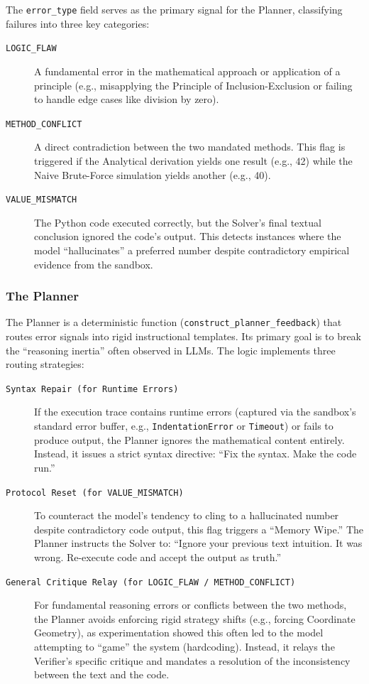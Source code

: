 \documentclass{article}
\begin{document}
The \texttt{error\_type} field serves as the primary signal for the Planner, classifying failures into three key categories:

\begin{description}
  \item[\texttt{LOGIC\_FLAW}]
  A fundamental error in the mathematical approach or application of a principle (e.g., misapplying the Principle of Inclusion-Exclusion or failing to handle edge cases like division by zero).
  
  \item[\texttt{METHOD\_CONFLICT}]
  A direct contradiction between the two mandated methods. This flag is triggered if the Analytical derivation yields one result (e.g., 42) while the Naive Brute-Force simulation yields another (e.g., 40).
  
  \item[\texttt{VALUE\_MISMATCH}]
  The Python code executed correctly, but the Solver's final textual conclusion ignored the code's output. This detects instances where the model ``hallucinates'' a preferred number despite contradictory empirical evidence from the sandbox.
\end{description}

\subsubsection{The Planner}

The Planner is a deterministic function (\texttt{construct\_planner\_feedback}) that routes error signals into rigid instructional templates. Its primary goal is to break the ``reasoning inertia'' often observed in LLMs. The logic implements three routing strategies:

\begin{description}
  \item[\texttt{Syntax Repair (for Runtime Errors)}]
  If the execution trace contains runtime errors (captured via the sandbox's standard error buffer, e.g., \texttt{IndentationError} or \texttt{Timeout}) or fails to produce output, the Planner ignores the mathematical content entirely. Instead, it issues a strict syntax directive: ``Fix the syntax. Make the code run.''
  
  \item[\texttt{Protocol Reset (for VALUE\_MISMATCH)}]
  To counteract the model's tendency to cling to a hallucinated number despite contradictory code output, this flag triggers a ``Memory Wipe.'' The Planner instructs the Solver to: ``Ignore your previous text intuition. It was wrong. Re-execute code and accept the output as truth.''
  
  \item[\texttt{General Critique Relay (for LOGIC\_FLAW / METHOD\_CONFLICT)}]
  For fundamental reasoning errors or conflicts between the two methods, the Planner avoids enforcing rigid strategy shifts (e.g., forcing Coordinate Geometry), as experimentation showed this often led to the model attempting to ``game'' the system (hardcoding). Instead, it relays the Verifier's specific critique and mandates a resolution of the inconsistency between the text and the code.
\end{description}
\end{document}
